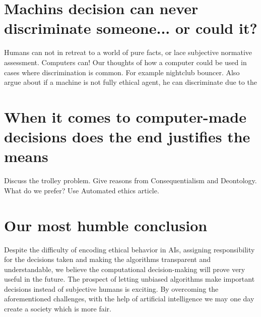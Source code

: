 \documentclass[11pt]{article}
\begin{document}
\section{Machins decision can never discriminate someone... or could it?}
Humans can not in retreat to a world of pure facts, or lace subjective normative assessment. Computers can!
Our thoughts of how a computer could be used in cases where discrimination is common. For example nightclub bouncer. Also argue about if a machine is not fully ethical agent, he can discriminate due to the

\section{When it comes to computer-made decisions does the end justifies the means}
Discuss the trolley problem. Give reasons from Consequentialism and Deontology.
What do we prefer? Use Automated ethics article.

\section{Our most humble conclusion}
Despite the difficulty of encoding ethical behavior in AIs,
assigning responsibility for the decisions taken and making the algorithms
transparent and understandable, we believe the computational decision-making
will prove very useful in the future. The prospect of letting unbiased
algorithms make important decisions instead of subjective humans is exciting. By
overcoming the aforementioned challenges, with the help of artificial
intelligence we may one day create a society which is more fair.





\end{document}
